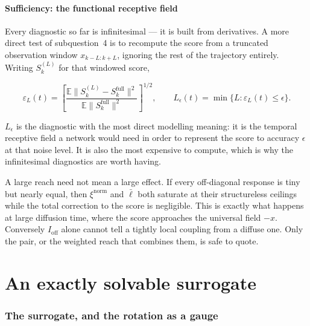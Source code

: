 \documentclass[11pt,a4paper]{article}
\newcommand{\E}{\mathbb{E}}
\begin{document}
\subsection{Sufficiency: the functional receptive field}

Every diagnostic so far is infinitesimal --- it is built from derivatives. A more direct test
of subquestion~4 is to recompute the score from a truncated observation window
$x_{k-L:k+L}$, ignoring the rest of the trajectory entirely. Writing $S_k^{(L)}$ for that
windowed score,

\begin{definitionbox}
\begin{equation}
 \varepsilon_L(t)=\left[\frac{\E\|S_k^{(L)}-S_k^{\mathrm{full}}\|^2}
                             {\E\|S_k^{\mathrm{full}}\|^2}\right]^{1/2},
 \qquad
 L_\epsilon(t)=\min\{L:\varepsilon_L(t)\le\epsilon\} .
 \label{eq:window-error}
\end{equation}
\end{definitionbox}

$L_\epsilon$ is the diagnostic with the most direct modelling meaning: it is the temporal
receptive field a network would need in order to represent the score to accuracy $\epsilon$ at
that noise level. It is also the most expensive to compute, which is why the infinitesimal
diagnostics are worth having.

\begin{caution}
A large reach need not mean a large effect. If every off-diagonal response is tiny but nearly
equal, then $\xi^{\mathrm{norm}}$ and $\bar\ell$ both saturate at their structureless
ceilings while the total correction to the score is negligible. This is exactly what happens
at large diffusion time, where the score approaches the universal field $-x$. Conversely
$I_{\mathrm{off}}$ alone cannot tell a tightly local coupling from a diffuse one. Only the
pair, or the weighted reach that combines them, is safe to quote.
\end{caution}

\clearpage
\part{An exactly solvable surrogate}

\section{The surrogate, and the rotation as a gauge}\label{sec:surrogate}
\end{document}
